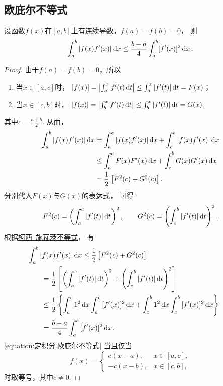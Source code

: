 \subsection{欧庇尔不等式}
\begin{theorem}[欧庇尔不等式]\label{theorem:定积分.欧庇尔不等式}
设函数\(f(x)\)在\([a,b]\)上有连续导数，\(f(a)=f(b)=0\)，
则\begin{equation}\label{equation:定积分.欧庇尔不等式}
	\int_a^b \abs{f(x) f'(x)} \dd{x}
	\leq \frac{b-a}{4}
	\int_a^b [f'(x)]^2 \dd{x}.
\end{equation}
\begin{proof}
由于\(f(a)=f(b)=0\)，所以\begin{enumerate}
	\item 当\(x \in \left[a,c\right]\)时，
	\(\abs{f(x)} = \abs{\int_a^x f'(t) \dd{t}} \leq \int_a^x \abs{f'(t)} \dd{t} = F(x)\)；
	\item 当\(x \in \left[c,b\right]\)时，
	\(\abs{f(x)} = \abs{\int_b^x f'(t) \dd{t}} \leq \int_b^x \abs{f'(t)} \dd{t} = G(x)\),
\end{enumerate}
其中\(c=\frac{a+b}{2}\).
从而，\begin{align*}
	\int_a^b \abs{f(x) f'(x)} \dd{x}
	&= \int_a^c \abs{f(x) f'(x)} \dd{x}
		+ \int_c^b \abs{f(x) f'(x)} \dd{x} \\
	&\leq \int_a^c F(x) F'(x) \dd{x}
		+ \int_c^b G(x) G'(x) \dd{x} \\
	&= \frac{1}{2} \left[ F^2(c) + G^2(c) \right].
\end{align*}
分别代入\(F(x)\)与\(G(x)\)的表达式，
可得\[
	F^2(c) = \left( \int_a^c \abs{f'(t)} \dd{t} \right)^2,
	\qquad
	G^2(c) = \left( \int_c^b \abs{f'(t)} \dd{t} \right)^2.
\]
根据\hyperref[equation:定积分.柯西--施瓦茨不等式]{柯西--施瓦茨不等式}，
有\begin{align*}
	&\hspace{-20pt}\int_a^b{\abs{f(x) f'(x)} \dd{x}}
	\leq \frac{1}{2} \left[
		F^2(c)
		+ G^2(c)
		\right] \\
	&= \frac{1}{2} \left[
		\left(\int_a^c{\abs{f'(t)}\dd{t}}\right)^2
		+\left(\int_c^b{\abs{f'(t)}\dd{t}}\right)^2
		\right] \\
	&\leq \frac{1}{2} \left\{
		\int_a^c{1^2 \dd{x}}
		\int_a^c{[f'(x)]^2 \dd{x}}
		+\int_c^b{1^2 \dd{x}}
		\int_c^b{[f'(x)]^2 \dd{x}}
		\right\} \\
	&= \frac{b-a}{4} \int_a^b{[f'(x)]^2 \dd{x}}.
\end{align*}
\cref{equation:定积分.欧庇尔不等式} 当且仅当\[
	f(x) = \left\{ \begin{array}{cl}
		c(x-a), & x\in\left[a,c\right], \\
		-c(x-b), & x\in\left[c,b\right],
	\end{array} \right.
\]时取等号，其中\(c\neq0\).
\end{proof}
\end{theorem}

